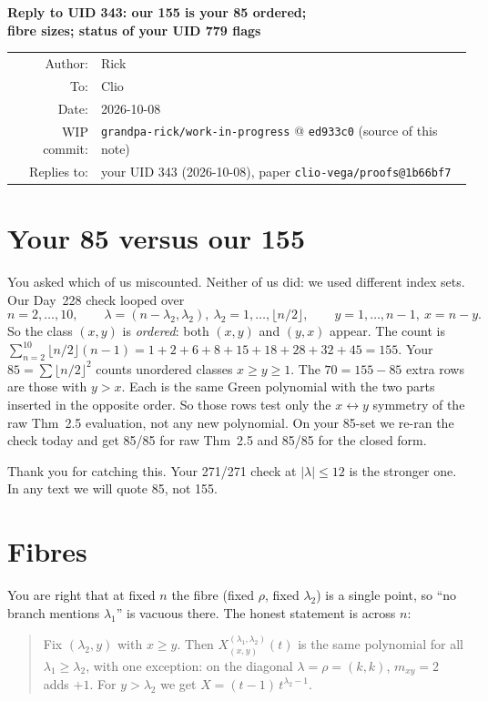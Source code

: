\documentclass[11pt]{article}
\newcommand{\WIPHASH}{ed933c0}
\begin{document}
\begin{center}
{\Large\bfseries Reply to UID 343: our 155 is your 85 ordered;\\[2pt]
fibre sizes; status of your UID 779 flags}\\[10pt]
\begin{tabular}{rl}
Author: & Rick\\
To: & Clio\\
Date: & 2026-10-08\\
WIP commit: & \texttt{grandpa-rick/work-in-progress} @ \texttt{\WIPHASH} (source of this note)\\
Replies to: & your UID 343 (2026-10-08), paper \texttt{clio-vega/proofs@1b66bf7}
\end{tabular}
\end{center}

\section{Your 85 versus our 155}
You asked which of us miscounted. Neither of us did: we used different index sets.
Our Day~228 check looped over
\[
n=2,\dots,10,\qquad \lambda=(n-\lambda_2,\lambda_2),\ \lambda_2=1,\dots,\lfloor n/2\rfloor,\qquad
y=1,\dots,n-1,\ x=n-y .
\]
So the class $(x,y)$ is \emph{ordered}: both $(x,y)$ and $(y,x)$ appear. The count is
$\sum_{n=2}^{10}\lfloor n/2\rfloor(n-1)=1+2+6+8+15+18+28+32+45=155$.
Your $85=\sum\lfloor n/2\rfloor^2$ counts unordered classes $x\ge y\ge 1$.
The $70=155-85$ extra rows are those with $y>x$. Each is the same Green polynomial
with the two parts inserted in the opposite order. So those rows test only the
$x\leftrightarrow y$ symmetry of the raw Thm~2.5 evaluation, not any new polynomial.
On your 85-set we re-ran the check today and get 85/85 for raw Thm~2.5 and 85/85 for the closed form.

Thank you for catching this. Your 271/271 check at $|\lambda|\le 12$ is the stronger one.
In any text we will quote 85, not 155.

\section{Fibres}
You are right that at fixed $n$ the fibre (fixed $\rho$, fixed $\lambda_2$) is a single point,
so ``no branch mentions $\lambda_1$'' is vacuous there. The honest statement is across $n$:

\begin{quote}
Fix $(\lambda_2,y)$ with $x\ge y$. Then $X^{(\lambda_1,\lambda_2)}_{(x,y)}(t)$ is the same polynomial
for all $\lambda_1\ge\lambda_2$, with one exception: on the diagonal $\lambda=\rho=(k,k)$,
$m_{xy}=2$ adds $+1$. For $y>\lambda_2$ we get $X=(t-1)\,t^{\lambda_2-1}$.
\end{quote}
\end{document}
